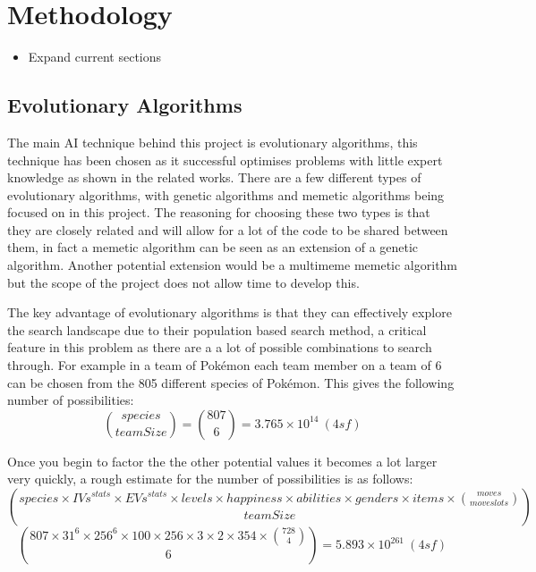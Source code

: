 \documentclass[a4paper]{article}
\newcommand{\Pokemon}{Pok\'{e}mon}
\begin{document}
\section{Methodology}
\begin{itemize}
	\item Expand current sections
\end{itemize}
\subsection{Evolutionary Algorithms}
\par
The main AI technique behind this project is evolutionary algorithms, this technique has been chosen as it successful optimises problems with little expert knowledge as shown in the related works.
There are a few different types of evolutionary algorithms, with genetic algorithms and memetic algorithms being focused on in this project.
The reasoning for choosing these two types is that they are closely related and will allow for a lot of the code to be shared between them, in fact a memetic algorithm can be seen as an extension of a genetic algorithm.
Another potential extension would be a multimeme memetic algorithm but the scope of the project does not allow time to develop this.
\par
The key advantage of evolutionary algorithms is that they can effectively explore the search landscape due to their population based search method, a critical feature in this problem as there are a a lot of possible combinations to search through.
For example in a team of \Pokemon{} each team member on a team of 6 can be chosen from the 805 different species of \Pokemon{}.
This gives the following number of possibilities:
\begin{equation}
{species \choose teamSize} = {807 \choose 6} = 3.765 \times 10^{14}\ (4sf) %
\end{equation}
\par
Once you begin to factor the the other potential values it becomes a lot larger very quickly, a rough estimate for the number of possibilities is as follows:
\begin{equation}
{species \times IVs^{stats} \times EVs^{stats} \times levels \times happiness \times abilities \times genders \times items \times {moves \choose move slots} \choose teamSize}
\end{equation}
\begin{equation}
    {807 \times 31^6 \times 256^6 \times 100 \times 256 \times 3 \times 2 \times 354 \times {728 \choose 4} \choose 6} = 5.893 \times 10^{261}\ (4sf)
\end{equation} %
\end{document}
